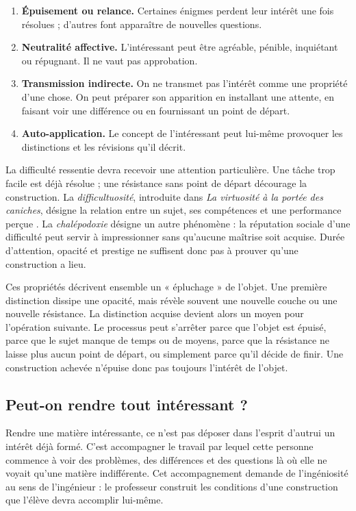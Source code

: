 \documentclass[11pt,a4paper]{article}
\begin{document}
\begin{enumerate}
  \item \textbf{Épuisement ou relance.} Certaines énigmes perdent leur intérêt
        une fois résolues ; d'autres font apparaître de nouvelles questions.
  \item \textbf{Neutralité affective.} L'intéressant peut être agréable,
        pénible, inquiétant ou répugnant. Il ne vaut pas approbation.
  \item \textbf{Transmission indirecte.} On ne transmet pas l'intérêt comme une
        propriété d'une chose. On peut préparer son apparition en installant
        une attente, en faisant voir une différence ou en fournissant un point
        de départ.
  \item \textbf{Auto-application.} Le concept de l'intéressant peut lui-même
        provoquer les distinctions et les révisions qu'il décrit.
\end{enumerate}

La difficulté ressentie devra recevoir une attention particulière. Une tâche
trop facile est déjà résolue ; une résistance sans point de départ décourage la
construction. La \emph{difficultuosité}, introduite dans \emph{La virtuosité à
la portée des caniches}, désigne la relation entre un sujet, ses compétences et
une performance perçue \parencite{pachet2027virtuosite}. La
\emph{chalépodoxie} désigne un autre phénomène : la réputation sociale d'une
difficulté peut servir à impressionner sans qu'aucune maîtrise soit acquise.
Durée d'attention, opacité et prestige ne suffisent donc pas à prouver qu'une
construction a lieu.

Ces propriétés décrivent ensemble un « épluchage » de l'objet. Une première
distinction dissipe une opacité, mais révèle souvent une nouvelle couche ou une
nouvelle résistance. La distinction acquise devient alors un moyen pour
l'opération suivante. Le processus peut s'arrêter parce que l'objet est épuisé,
parce que le sujet manque de temps ou de moyens, parce que la résistance ne
laisse plus aucun point de départ, ou simplement parce qu'il décide de finir.
Une construction achevée n'épuise donc pas toujours l'intérêt de l'objet.

\subsection{Peut-on rendre tout intéressant ?}

Rendre une matière intéressante, ce n'est pas déposer dans l'esprit d'autrui un
intérêt déjà formé. C'est accompagner le travail par lequel cette personne
commence à voir des problèmes, des différences et des questions là où elle ne
voyait qu'une matière indifférente. Cet accompagnement demande de l'ingéniosité
au sens de l'ingénieur : le professeur construit les conditions d'une
construction que l'élève devra accomplir lui-même.
\end{document}
